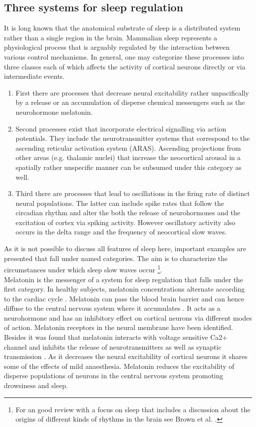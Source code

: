 \subsection{Three systems for sleep regulation}
It is long known that the anatomical substrate of sleep is a distributed system rather than a single region in the brain\parencite{akert1965anatomical}. Mammalian sleep represents a physiological process that is arguably regulated by the interaction between various control mechanisms. In general, one may categorize these processes into three classes each of which affects the activity of cortical neurons directly or via intermediate events.
\begin{enumerate}[label={(\arabic*)}]
    \item First there are processes that decrease neural excitability rather unpacifically by a release or an accumulation of disperse chemical messengers such as the neurohormone melatonin.
    \item Second processes exist that incorporate electrical signalling via action potentials. They include the neurotransmitter systems that correspond to the ascending reticular activation system (ARAS). Ascending projections from other areas (e.g. thalamic nuclei) that increase the neocortical arousal in a spatially rather unspecific manner can be subsumed under this category as well.
    \item Third there are processes that lead to oscillations in the firing rate of distinct neural populations. The latter can include spike rates that follow the circadian rhythm and alter the both the release of neurohormones and the excitation of cortex via spiking activity. However oscillatory activity also occurs in the delta range and the frequency of neocortical slow waves.
\end{enumerate}
As it is not possible to discuss all features of sleep here, important examples are presented that fall under named categories. The aim is to characterize the circumstances under which sleep slow waves occur \footnote{For an good review with a focus on sleep that includes a discussion about the origins of different kinds of rhythms in the brain see Brown et al. \parencite*{brown2012control}.}.\\
Melatonin is the messenger of a system for sleep regulation that falls under the first category. In healthy subjects, melatonin concentrations alternate according to the cardiac cycle \parencite{montagna2005fatal}. Melatonin can pass the blood brain barrier and can hence diffuse to the central nervous system where it accumulates \parencite{aulinas2019physiology}. It acts as a neurohormone and has an inhibitory effect on cortical neurons via different modes of action. Melatonin receptors in the neural membrane have been identified. Besides it was found that melatonin interacts with voltage sensitive Ca2+ channel and inhibits the release of neurotransmitters as well as synaptic transmission \parencite{choi2014melatonin}. As it decreases the neural excitability of cortical neurons it shares some of the effects of mild anaesthesia. Melatonin reduces the excitability of disperse populations of neurons in the central nervous system promoting drowsiness and sleep. \\
